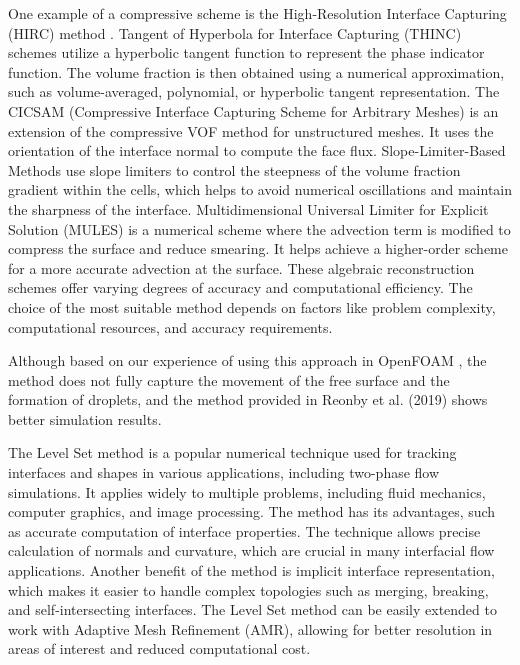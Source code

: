 One example of a compressive scheme is the High-Resolution Interface Capturing (\ac{HIRC}) method \cite{HIRC}. Tangent of Hyperbola for Interface Capturing (\ac{THINC}) \cite{THINC} schemes utilize a hyperbolic tangent function to represent the phase indicator function. The volume fraction is then obtained using a numerical approximation, such as volume-averaged, polynomial, or hyperbolic tangent representation. The \ac{CICSAM} (Compressive Interface Capturing Scheme for Arbitrary Meshes)\cite{CICSAM} is an extension of the compressive VOF method for unstructured meshes. It uses the orientation of the interface normal to compute the face flux. Slope-Limiter-Based Methods \cite{liu2021new} use slope limiters to control the steepness of the volume fraction gradient within the cells, which helps to avoid numerical oscillations and maintain the sharpness of the interface. Multidimensional Universal Limiter for Explicit Solution (\ac{MULES})\cite{MULES} is a numerical scheme where the advection term is modified to compress the surface and reduce smearing. It helps achieve a higher-order scheme for a more accurate advection at the surface. These algebraic reconstruction schemes offer varying degrees of accuracy and computational efficiency. The choice of the most suitable method depends on factors like problem complexity, computational resources, and accuracy requirements. 

Although based on our experience of using this approach in OpenFOAM \cite{MULES}, the method does not fully capture the movement of the free surface and the formation of droplets, and the method provided in Reonby et al. (2019)\cite{roenby2019isoadvector} shows better simulation results.

The Level Set method is a popular numerical technique used for tracking interfaces and shapes in various applications, including two-phase flow simulations. It applies widely to multiple problems, including fluid mechanics, computer graphics, and image processing. The method has its advantages, such as accurate computation of interface properties. The technique allows precise calculation of normals and curvature, which are crucial in many interfacial flow applications. Another benefit of the method is implicit interface representation, which makes it easier to handle complex topologies such as merging, breaking, and self-intersecting interfaces. The Level Set method can be easily extended to work with Adaptive Mesh Refinement (AMR), allowing for better resolution in areas of interest and reduced computational cost.

